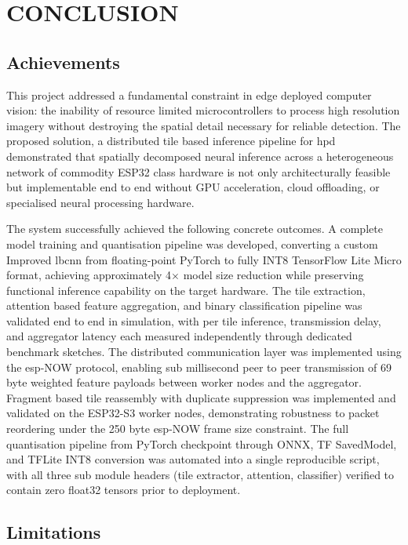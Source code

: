 \chapter{CONCLUSION}
 
\section{Achievements}
 
This project addressed a fundamental constraint in edge deployed computer vision: the
inability of resource limited microcontrollers to process high resolution imagery without
destroying the spatial detail necessary for reliable detection. The proposed solution, a
distributed tile based inference pipeline for \gls{hpd} demonstrated that spatially
decomposed neural inference across a heterogeneous network of commodity ESP32 class
hardware is not only architecturally feasible but implementable end to end without GPU
acceleration, cloud offloading, or specialised neural processing hardware.
 
The system successfully achieved the following concrete outcomes. A complete model
training and quantisation pipeline was developed, converting a custom Improved
\gls{lbcnn} from floating-point PyTorch to fully INT8 TensorFlow Lite Micro format,
achieving approximately 4$\times$ model size reduction while preserving functional
inference capability on the target hardware. The tile extraction, attention based feature
aggregation, and binary classification pipeline was validated end to end in simulation,
with per tile inference, transmission delay, and aggregator latency each measured
independently through dedicated benchmark sketches. The distributed communication layer
was implemented using the \gls{esp}-NOW protocol, enabling sub millisecond
peer to peer transmission of 69 byte weighted feature payloads between worker nodes and
the aggregator. Fragment based tile reassembly with duplicate suppression was implemented
and validated on the ESP32-S3 worker nodes, demonstrating robustness to packet
reordering under the 250 byte \gls{esp}-NOW frame size constraint. The full quantisation
pipeline from PyTorch checkpoint through ONNX, TF SavedModel, and TFLite INT8
conversion was automated into a single reproducible script, with all three sub module
headers (tile extractor, attention, classifier) verified to contain zero float32 tensors
prior to deployment.
 
\section{Limitations}
 
